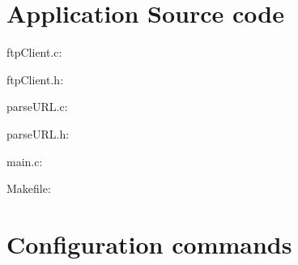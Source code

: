 \documentclass[11pt,a4paper,reqno]{article}
\numberwithin{equation}{section}
\begin{document}
\begin{appendices}

\section{Application Source code}

\begin{Large}
ftpClient.c:
\end{Large}



\vspace{15mm}

\begin{Large}
ftpClient.h:
\end{Large}



\vspace{15mm}

\begin{Large}
parseURL.c:
\end{Large}



\vspace{15mm}

\begin{Large}
parseURL.h:
\end{Large}



\vspace{15mm}

\begin{Large}
main.c:
\end{Large}



\vspace{15mm}

\begin{Large}
Makefile:
\end{Large}



\vspace{15mm}

\section{Configuration commands}


\end{appendices}
\end{document}
